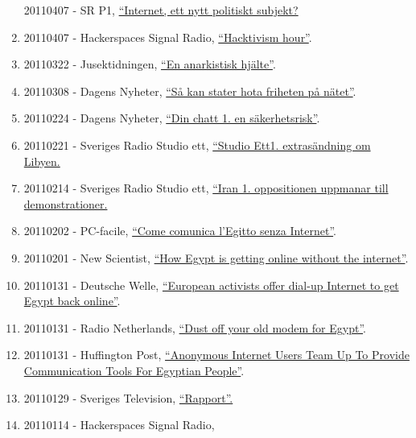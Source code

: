 \documentclass[
]{article}
\begin{document}
\begin{enumerate}
  20110407 - SR P1, \href{http://t.sr.se/PbptWr}{``Internet, ett nytt
  politiskt subjekt?}
\item
  20110407 - Hackerspaces Signal Radio,
  \href{http://signal.hackerspaces.org/archive/2011-04-07-2200-hacktivism-hour.mp3}{``Hacktivism
  hour''}.
\item
  20110322 - Jusektidningen,
  \href{http://www.tidningenkarriar.se/Arkivet/2011/3/Anarkistisk-hjalte/}{``En
  anarkistisk hjälte''}.
\item
  20110308 - Dagens Nyheter,
  \href{http://www.dn.se/vart-internet/vart-internet-hem/sa-kan-stater-hota-friheten-pa-natet/}{``Så
  kan stater hota friheten på nätet''}.
\item
  20110224 - Dagens Nyheter,
  \href{http://www.dn.se/vart-internet/vart-internet-hem/din-chatt-en-sakerhetsrisk/}{``Din
  chatt 1. en säkerhetsrisk''}.
\item
  20110221 - Sveriges Radio Studio ett,
  \href{http://t.sr.se/1cUlHfI}{``Studio Ett1. extrasändning om Libyen.}
\item
  20110214 - Sveriges Radio Studio ett,
  \href{http://t.sr.se/1D1zCXq}{``Iran 1. oppositionen uppmanar till
  demonstrationer.}
\item
  20110202 - PC-facile,
  \href{http://www.pc-facile.com/news/come_comunica_egitto_senza_internet/68959.htm}{``Come
  comunica l'Egitto senza Internet''}.
\item
  20110201 - New Scientist,
  \href{http://www.newscientist.com/blogs/onepercent/2011/02/egypt-remains-officially-offli.html}{``How
  Egypt is getting online without the internet''}.
\item
  20110131 - Deutsche Welle,
  \href{http://www.dw.com/en/european-activists-offer-dial-up-internet-to-get-egypt-back-online/a-14807049}{``European
  activists offer dial-up Internet to get Egypt back online''}.
\item
  20110131 - Radio Netherlands,
  \href{http://www.rnw.nl/english/article/dust-your-dialup-modem-contact-egypt}{``Dust
  off your old modem for Egypt''}.
\item
  20110131 - Huffington Post,
  \href{http://www.huffingtonpost.com/2011/01/29/anonymous-internet-egypt_n_815889.html}{``Anonymous
  Internet Users Team Up To Provide Communication Tools For Egyptian
  People''}.
\item
  20110129 - Sveriges Television,
  \href{http://www.youtube.com/watch?v=HRZ0QKyiFsE\&feature=related}{``Rapport''.}
\item
  20110114 - Hackerspaces Signal Radio,

\end{enumerate}
\end{document}

